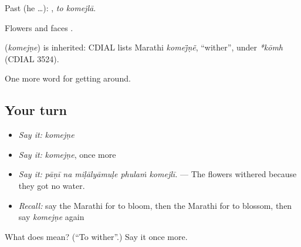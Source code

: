 Past (he …):  , \emph{to komejlā}.

Flowers and faces .

\begin{cousinweb}
\textbf{} (\emph{komejṇe}) is inherited: CDIAL lists Marathi \emph{komej̈ṇẽ}, \textquotedblleft{}wither\textquotedblright{}, under \emph{*kōmh} (CDIAL 3524).
\end{cousinweb}

\begin{grammarlens}[title={What you've built}]
One more word for getting around.
\end{grammarlens}

\subsection*{Your turn}
\begin{itemize}
\raggedright
  \item \emph{Say it:} \emph{komejṇe}
  \item \emph{Say it:} \emph{komejṇe}, once more
  \item \emph{Say it:} \emph{pāṇī na miḷālyāmuḷe phulaṁ komejlī.} — The flowers withered because they got no water.
  \item \emph{Recall:} say the Marathi for to bloom, then the Marathi for to blossom, then say \emph{komejṇe} again
\end{itemize}

\begin{tcolorbox}[breakable,colback=teal!4,colframe=teal!35!black,title={Before you move on}]
What does  mean? (\textquotedblleft{}To wither\textquotedblright{}.) Say it once more.
\end{tcolorbox}
